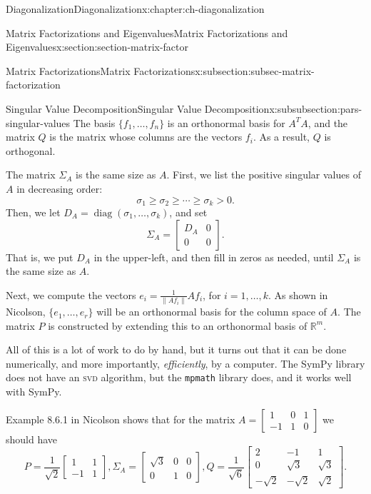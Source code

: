 \documentclass[oneside,10pt,]{book}
\newcommand{\mono}[1]{\texttt{#1}}
\newcommand{\initialism}[1]{\textsc{\MakeLowercase{#1}}}
\numberwithin{equation}{section}
\newcommand{\bbm}{\begin{bmatrix}}
\newcommand{\ebm}{\end{bmatrix}}
\newcommand{\R}{\mathbb{R}}
\newcommand{\len}[1]{\lVert #1\rVert}
\newcommand{\gt}{>}
\newcommand{\amp}{&}
\begin{document}
\begin{chapterptx}{Diagonalization}{}{Diagonalization}{}{}{x:chapter:ch-diagonalization}
\begin{sectionptx}{Matrix Factorizations and Eigenvalues}{}{Matrix Factorizations and Eigenvalues}{}{}{x:section:section-matrix-factor}
\begin{subsectionptx}{Matrix Factorizations}{}{Matrix Factorizations}{}{}{x:subsection:subsec-matrix-factorization}
\begin{subsubsectionptx}{Singular Value Decomposition}{}{Singular Value Decomposition}{}{}{x:subsubsection:pars-singular-values}
The basis \(\{f_1,\ldots, f_n\}\) is an orthonormal basis for \(A^TA\), and the matrix \(Q\) is the matrix whose columns are the vectors \(f_i\). As a result, \(Q\) is orthogonal.%
\par
The matrix \(\Sigma_A\) is the same size as \(A\). First, we list the positive singular values of \(A\) in decreasing order:%
\begin{equation*}
\sigma_1\geq \sigma_2\geq \cdots \geq \sigma_k\gt 0\text{.}
\end{equation*}
Then, we let \(D_A = \operatorname{diag}(\sigma_1,\ldots, \sigma_k)\), and set%
\begin{equation*}
\Sigma_A = \begin{bmatrix}D_A\amp 0\\0\amp 0\end{bmatrix}\text{.}
\end{equation*}
That is, we put \(D_A\) in the upper-left, and then fill in zeros as needed, until \(\Sigma_A\) is the same size as \(A\).%
\par
Next, we compute the vectors \(e_i = \frac{1}{\len{Af_i}}Af_i\), for \(i=1,\ldots, k\). As shown in Nicolson, \(\{e_1,\ldots, e_r\}\) will be an orthonormal basis for the column space of \(A\). The matrix \(P\) is constructed by extending this to an orthonormal basis of \(\R^m\).%
\par
All of this is a lot of work to do by hand, but it turns out that it can be done numerically, and more importantly, \emph{efficiently}, by a computer. The SymPy library does not have an \initialism{SVD} algorithm, but the \mono{mpmath} library does, and it works well with SymPy.%
\par
Example 8.6.1 in Nicolson shows that for the matrix \(A = \begin{bmatrix}1\amp 0\amp 1\\-1\amp 1\amp 0\end{bmatrix}\) we should have%
\begin{equation*}
P = \frac{1}{\sqrt{2}}\bbm 1\amp 1\\-1\amp 1\ebm, \Sigma_A = \bbm \sqrt{3}\amp 0\amp 0\\0\amp 1\amp 0\ebm, Q = \frac{1}{\sqrt{6}}\bbm2\amp -1\amp 1\\0\amp \sqrt{3}\amp \sqrt{3}\\-\sqrt{2}\amp -\sqrt{2}\amp \sqrt{2}\ebm\text{.}
\end{equation*}

\end{subsubsectionptx}
\end{subsectionptx}
\end{sectionptx}
\end{chapterptx}
\end{document}
